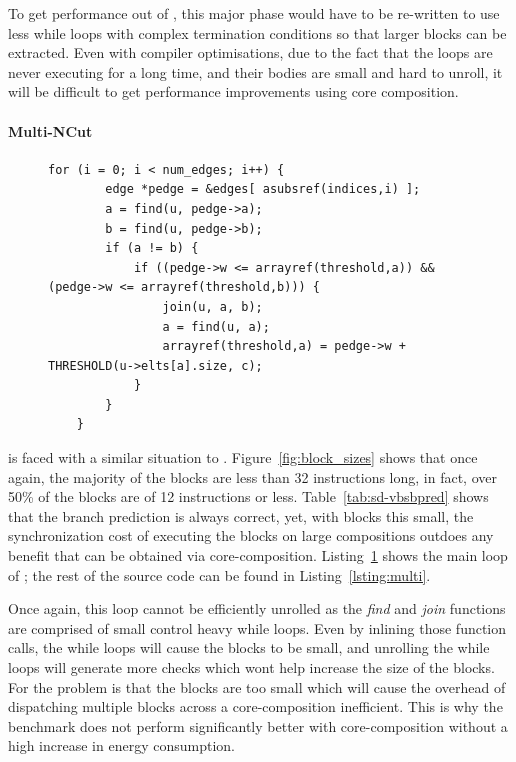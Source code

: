 To get performance out of , this major phase would have to be re-written to use less while loops with complex termination conditions so that larger blocks can be extracted.
Even with compiler optimisations, due to the fact that the loops are never executing for a long time, and their bodies are small and hard to unroll, it will be difficult to get performance improvements using core composition.

\paragraph*{Multi-NCut}

\begin{figure}[t]
\lstset{language=C,numbersep=4pt}
\begin{center}
\begin{lstlisting}[firstnumber=49]
 for (i = 0; i < num_edges; i++) {
        edge *pedge = &edges[ asubsref(indices,i) ];
		a = find(u, pedge->a);
        b = find(u, pedge->b);
        if (a != b) {
            if ((pedge->w <= arrayref(threshold,a)) && (pedge->w <= arrayref(threshold,b))) {
	            join(u, a, b);
	            a = find(u, a);
	            arrayref(threshold,a) = pedge->w + THRESHOLD(u->elts[a].size, c);
            }
        }
    }
\end{lstlisting}
\end{center}
\vspace{-1em}
\label{lst:multi_loop}
\vspace{1em}
\end{figure}

 is faced with a similar situation to .
Figure~\ref{fig:block_sizes} shows that once again, the majority of the blocks are less than 32 instructions long, in fact, over 50\% of the blocks are of 12 instructions or less.
Table~\ref{tab:sd-vbsbpred} shows that the branch prediction is always correct, yet, with blocks this small, the synchronization cost of executing the blocks on large compositions outdoes any benefit that can be obtained via core-composition.
Listing~\ref{lst:multi_loop} shows the main loop of ; the rest of the source code can be found in Listing~\ref{lsting:multi}.%

Once again, this loop cannot be efficiently unrolled as the \textit{find} and \textit{join} functions are comprised of small control heavy while loops.
Even by inlining those function calls, the while loops will cause the blocks to be small, and unrolling the while loops will generate more checks which wont help increase the size of the blocks.
For  the problem is that the blocks are too small which will cause the overhead of dispatching multiple blocks across a core-composition inefficient.
This is why the benchmark does not perform significantly better with core-composition without a high increase in energy consumption.


